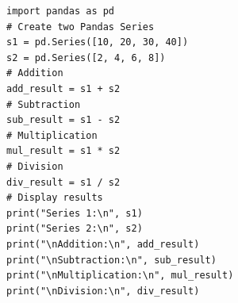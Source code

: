 \begin{verbatim}
import pandas as pd
# Create two Pandas Series
s1 = pd.Series([10, 20, 30, 40])
s2 = pd.Series([2, 4, 6, 8])
# Addition
add_result = s1 + s2
# Subtraction
sub_result = s1 - s2
# Multiplication
mul_result = s1 * s2
# Division
div_result = s1 / s2
# Display results
print("Series 1:\n", s1)
print("Series 2:\n", s2)
print("\nAddition:\n", add_result)
print("\nSubtraction:\n", sub_result)
print("\nMultiplication:\n", mul_result)
print("\nDivision:\n", div_result)
\end{verbatim}